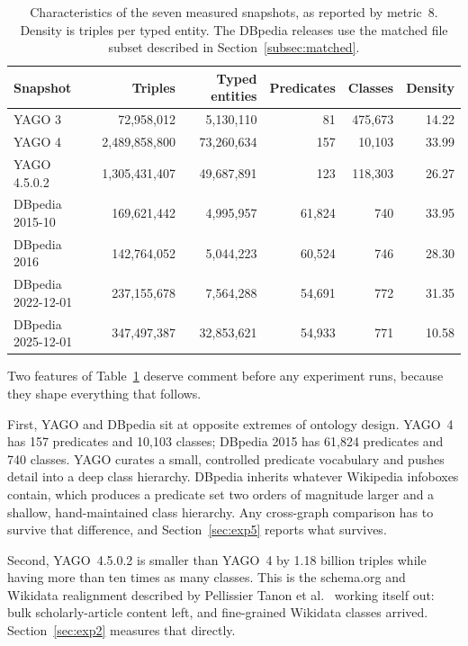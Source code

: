 \begin{table}[htbp]
  \centering
  \caption[]{Characteristics of the seven measured
    snapshots, as reported by metric~8. Density is triples per typed entity.
    The DBpedia releases use the matched file subset described in
    Section~\ref{subsec:matched}.}
  \label{tab:datasets}
  \footnotesize
  \begin{tabular}{lrrrrr}
    \toprule
    Snapshot & Triples & Typed entities & Predicates & Classes & Density \\
    \midrule
    YAGO 3               & 72{,}958{,}012    & 5{,}130{,}110  & 81      & 475{,}673 & 14.22 \\
    YAGO 4               & 2{,}489{,}858{,}800 & 73{,}260{,}634 & 157   & 10{,}103  & 33.99 \\
    YAGO 4.5.0.2         & 1{,}305{,}431{,}407 & 49{,}687{,}891 & 123   & 118{,}303 & 26.27 \\
    DBpedia 2015-10      & 169{,}621{,}442   & 4{,}995{,}957  & 61{,}824 & 740    & 33.95 \\
    DBpedia 2016         & 142{,}764{,}052   & 5{,}044{,}223  & 60{,}524 & 746    & 28.30 \\
    DBpedia 2022-12-01   & 237{,}155{,}678   & 7{,}564{,}288  & 54{,}691 & 772    & 31.35 \\
    DBpedia 2025-12-01   & 347{,}497{,}387   & 32{,}853{,}621 & 54{,}933 & 771    & 10.58 \\
    \bottomrule
  \end{tabular}
\end{table}

Two features of Table~\ref{tab:datasets} deserve comment before any experiment
runs, because they shape everything that follows.

First, YAGO and DBpedia sit at opposite extremes of ontology design. YAGO~4 has
157 predicates and 10{,}103 classes; DBpedia 2015 has 61{,}824 predicates and 740
classes. YAGO curates a small, controlled predicate vocabulary and pushes
detail into a deep class hierarchy. DBpedia inherits whatever Wikipedia
infoboxes contain, which produces a predicate set two orders of magnitude larger
and a shallow, hand-maintained class hierarchy. Any cross-graph comparison has to
survive that difference, and Section~\ref{sec:exp5} reports what survives.

Second, YAGO~4.5.0.2 is smaller than YAGO~4 by 1.18 billion triples while having
more than ten times as many classes. This is the schema.org and Wikidata
realignment described by Pellissier Tanon et al.~\cite{tanon2020yago} working
itself out: bulk scholarly-article content left, and fine-grained Wikidata
classes arrived. Section~\ref{sec:exp2} measures that directly.

